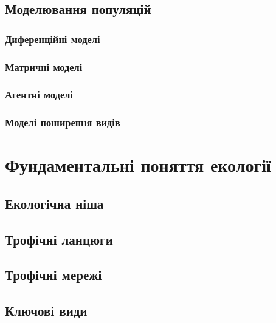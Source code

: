 \documentclass[
  11pt,
]{book}
\begin{document}
\section{Моделювання популяцій}\label{Leslie-matrix}

\subsection{Диференційні моделі}\label{ux434ux438ux444ux435ux440ux435ux43dux446ux456ux439ux43dux456-ux43cux43eux434ux435ux43bux456}

\subsection{Матричні моделі}\label{ux43cux430ux442ux440ux438ux447ux43dux456-ux43cux43eux434ux435ux43bux456}

\subsection{Агентні моделі}\label{ux430ux433ux435ux43dux442ux43dux456-ux43cux43eux434ux435ux43bux456}

\subsection{Моделі поширення видів}\label{ux43cux43eux434ux435ux43bux456-ux43fux43eux448ux438ux440ux435ux43dux43dux44f-ux432ux438ux434ux456ux432}

\chapter{Фундаментальні поняття екології}\label{foundations}

\section{Екологічна ніша}\label{niche}

\section{Трофічні ланцюги}\label{food-chain}

\section{Трофічні мережі}\label{food-webs}

\section{Ключові види}\label{keystones}
\end{document}
